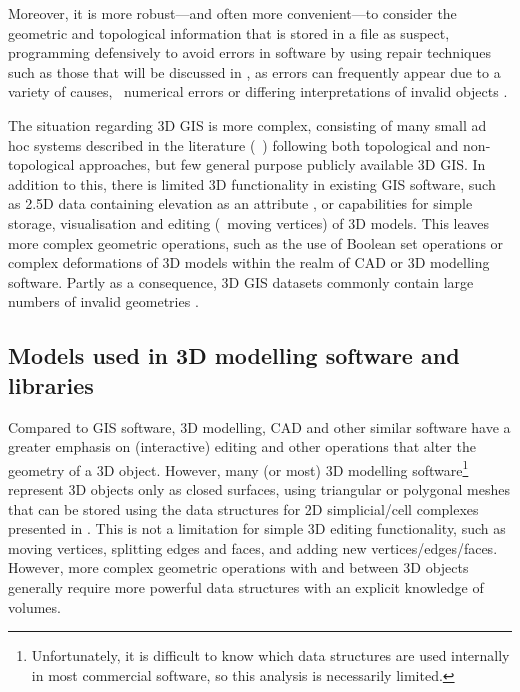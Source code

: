 Moreover, it is more robust---and often more convenient---to consider the geometric and topological information that is stored in a file as suspect, programming defensively to avoid errors in software by using repair techniques such as those that will be discussed in , as errors can frequently appear due to a variety of causes, \eg\ numerical errors \citep{Goldberg91,Schirra97} or differing interpretations of invalid objects \citep{Ledoux14}.

The situation regarding 3D GIS is more complex, consisting of many small ad hoc systems described in the literature (\eg\ \citep{Zhang11}) following both topological and non-topological approaches, but few general purpose publicly available 3D GIS.\@
In addition to this, there is limited 3D functionality in existing GIS software, such as 2.5D data containing elevation as an attribute \citep{Raper89}, or capabilities for simple storage, visualisation and editing (\eg\ moving vertices) of 3D models.
This leaves more complex geometric operations, such as the use of Boolean set operations or complex deformations of 3D models within the realm of CAD or 3D modelling software.
Partly as a consequence, 3D GIS datasets commonly contain large numbers of invalid geometries \citep{Zhao14}.

\subsection{Models used in 3D modelling software and libraries}

Compared to GIS software, 3D modelling, CAD and other similar software have a greater emphasis on (interactive) editing and other operations that alter the geometry of a 3D object.
However, many (or most) 3D modelling software\footnote{Unfortunately, it is difficult to know which data structures are used internally in most commercial software, so this analysis is necessarily limited.} represent 3D objects only as closed surfaces, using triangular or polygonal meshes that can be stored using the data structures for 2D simplicial/cell complexes presented in .
This is not a limitation for simple 3D editing functionality, such as moving vertices, splitting edges and faces, and adding new vertices/edges/faces.
However, more complex geometric operations with and between 3D objects generally require more powerful data structures with an explicit knowledge of volumes.


